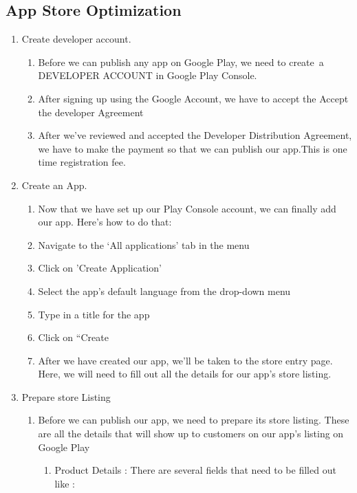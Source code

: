 \subsection{App Store Optimization}
 \begin{enumerate}
     \item Create developer account.
    \begin{enumerate}
        \item Before we can publish any app on Google Play, we need to create a DEVELOPER ACCOUNT in Google Play Console.
        \item After signing up using the Google Account, we have to accept the Accept the developer Agreement
        \item After we’ve reviewed and accepted the Developer Distribution Agreement, we have to make the  payment so that we can publish our app.This is one time registration fee.
    \end{enumerate} 
    \item Create an App.
    \begin{enumerate}
        \item Now that we have set up our Play Console account, we can finally add our app. Here’s how to do that:
        \item Navigate to the ‘All applications’ tab in the menu
        \item Click on 'Create Application'
        \item Select the app’s default language from the drop-down menu
        \item Type in a title for the app
        \item Click on “Create
        \item  After we have created our app, we’ll be taken to the store entry page. Here, we will need to fill out all the details for our app’s store listing.
    \end{enumerate}
    \item Prepare store Listing
    \begin{enumerate}
        \item Before we can publish our app, we need to prepare its store listing. These are all the details that will show up to customers on our app’s listing on Google Play
        \begin{enumerate}
            \item Product Details : There are several fields that need to be filled out like :
            \begin{enumerate}

\end{enumerate}
\end{enumerate}
\end{enumerate}
\end{enumerate}
